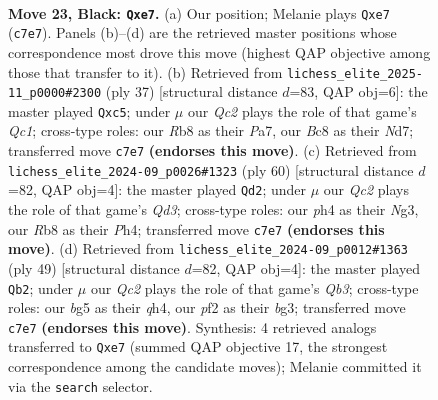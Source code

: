 \documentclass[11pt]{article}
\begin{document}
\clearpage

\begin{figure}[p]\centering
\begin{subfigure}{0.46\textwidth}\centering
\resizebox{\linewidth}{!}{%
\newchessgame
\chessboard[
  setfen={1rb1k2r/2q1R1pp/1p6/p2Q2B1/3p3P/8/PP3PP1/RN4K1 b - - 0 23},
  showmover=false,
  pgfstyle=straightmove, color=movearrow, markmove={c7-e7}
]}
\caption{}
\end{subfigure}\hfill
\begin{subfigure}{0.46\textwidth}\centering
\resizebox{\linewidth}{!}{%
\newchessgame
\chessboard[
  setfen={2q2rk1/p2npp2/6p1/2R4p/5B1P/4QP2/PKP3P1/7R b - - 0 19},
  showmover=false,
  pgfstyle=straightmove, color=movearrow, markmove={c8-c5}
]}
\caption{}
\end{subfigure}
\\[4pt]
\begin{subfigure}{0.46\textwidth}\centering
\resizebox{\linewidth}{!}{%
\newchessgame
\chessboard[
  setfen={rr4k1/2p2ppp/2p5/3bq3/P2R3P/3Q2N1/5PP1/3R2K1 w - - 0 31},
  showmover=false,
  pgfstyle=straightmove, color=movearrow, markmove={d3-d2}
]}
\caption{}
\end{subfigure}\hfill
\begin{subfigure}{0.46\textwidth}\centering
\resizebox{\linewidth}{!}{%
\newchessgame
\chessboard[
  setfen={r2r2k1/2R2pp1/1q4bp/p7/7Q/5PB1/P1n3PP/2R2B1K b - - 2 25},
  showmover=false,
  pgfstyle=straightmove, color=movearrow, markmove={b6-b2}
]}
\caption{}
\end{subfigure}
\caption{\textbf{Move 23, Black: \texttt{Qxe7}.} (a) Our position; Melanie plays \texttt{Qxe7} (\texttt{c7e7}). Panels (b)--(d) are the retrieved master positions whose correspondence most drove this move (highest QAP objective among those that transfer to it). (b) Retrieved from \texttt{lichess\_elite\_2025-11\_p0000\#2300} (ply 37) [structural distance $d$=83, QAP obj=6]: the master played \texttt{Qxc5}; under $\mu$ our \emph{Qc2} plays the role of that game's \emph{Qc1}; cross-type roles: our \emph{R}b8 as their \emph{P}a7, our \emph{B}c8 as their \emph{N}d7; transferred move \texttt{c7e7} \textbf{(endorses this move)}. (c) Retrieved from \texttt{lichess\_elite\_2024-09\_p0026\#1323} (ply 60) [structural distance $d$=82, QAP obj=4]: the master played \texttt{Qd2}; under $\mu$ our \emph{Qc2} plays the role of that game's \emph{Qd3}; cross-type roles: our \emph{p}h4 as their \emph{N}g3, our \emph{R}b8 as their \emph{P}h4; transferred move \texttt{c7e7} \textbf{(endorses this move)}. (d) Retrieved from \texttt{lichess\_elite\_2024-09\_p0012\#1363} (ply 49) [structural distance $d$=82, QAP obj=4]: the master played \texttt{Qb2}; under $\mu$ our \emph{Qc2} plays the role of that game's \emph{Qb3}; cross-type roles: our \emph{b}g5 as their \emph{q}h4, our \emph{p}f2 as their \emph{b}g3; transferred move \texttt{c7e7} \textbf{(endorses this move)}. Synthesis: 4 retrieved analogs transferred to \texttt{Qxe7} (summed QAP objective 17, the strongest correspondence among the candidate moves); Melanie committed it via the \texttt{search} selector.}
\label{fig:thought-m45}
\end{figure}
\end{document}
